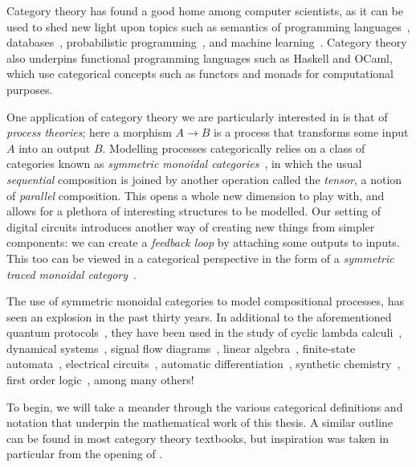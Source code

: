 Category theory has found a good home among computer scientists, as
it can be used to shed new light upon topics such as semantics of programming
languages~\cite{oles1982categorytheoretic}, databases~\cite{spivak2012functorial},
probabilistic programming~\cite{cho2019disintegration,fritz2020synthetic}, and
machine learning~\cite{fong2019backprop,cockett2020reverse}.
Category theory also underpins functional programming languages such as
Haskell and OCaml, which use categorical concepts such as functors and monads
for computational purposes.

One application of category theory we are particularly interested in is that of
\emph{process theories}; here a morphism \(A \to B\) is a process that
transforms some input \(A\) into an output \(B\).
Modelling processes categorically relies on a class of categories known as
\emph{symmetric monoidal categories}~\cite{maclane1963natural}, in which the
usual \emph{sequential} composition is joined by another operation called the
\emph{tensor}, a notion of \emph{parallel} composition.
This opens a whole new dimension to play with, and allows for a plethora of
interesting structures to be modelled.
Our setting of digital circuits introduces another way of creating new things
from simpler components: we can create a \emph{feedback loop} by attaching some
outputs to inputs.
This too can be viewed in a categorical perspective in the form of a
\emph{symmetric traced monoidal category}~\cite{joyal1996traced}.

The use of symmetric monoidal categories to model compositional processes, has
seen an explosion in the past thirty years.
In additional to the aforementioned quantum protocols~\cite{coecke2008interacting},
they have been used in the study of cyclic lambda
calculi~\cite{hasegawa1997recursion}, dynamical
systems~\cite{baez2015categories,fong2016categorical}, signal flow
diagrams~\cite{bonchi2014categorical,bonchi2015full,bonchi2017refinement,bonchi2021survey},
linear algebra~\cite{bonchi2017interacting,zanasi2015interacting,bonchi2019graphical,boisseau2022graphical},
finite-state automata~\cite{piedeleu2021string,piedeleu2022finite}, electrical
circuits~\cite{boisseau2022string}, automatic
differentiation~\cite{alvarez-picallo2023functorial}, synthetic
chemistry~\cite{gale2023categorical}, first order
logic~\cite{bonchi2024diagrammatic}, among many others!

To begin, we will take a meander through the various categorical definitions and
notation that underpin the mathematical work of this thesis.
A similar outline can be found in most category theory textbooks, but
inspiration was taken in particular from the opening of
\cite{ghica2023hierarchical}.

